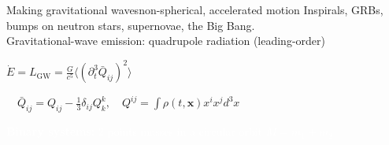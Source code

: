 \documentclass[xcolor=dvipsnames,t]{beamer}
\newcommand{\f}{\frac}
\begin{document}
 \begin{frame}{Making gravitational waves}{non-spherical, accelerated motion}
  \alert{Inspirals}, GRBs, bumps on neutron stars, supernovae, the Big Bang. \\%
  Gravitational-wave emission: \alert{quadrupole} radiation (leading-order)
  \begin{center} $ \boxed{\dot{E}=L_\text{GW} = \f{G}{c^5} \langle (\partial_t^3 \bar{Q}_{ij})^2 \rangle}$\\
  \vspace{2mm}
  \begin{small}$ \quad \bar{Q}_{ij} = Q_{ij}-\frac{1}{3}\delta_{ij}Q^k_k, \quad Q^{ij} = \int \rho(t,{\mathbf x})x^i x^j d^3 x $ \end{small} \end{center}
  \textcolor{white}{{\bf Binary systems:} 2 points masses in a circular orbit $M=m_1+m_2$}
\end{frame}
\end{document}
